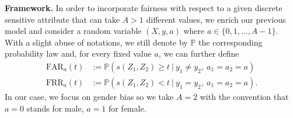 \documentclass[nohyperref]{article}
\theoremstyle{plain}
\theoremstyle{definition}
\theoremstyle{remark}
\begin{document}
{\bf Framework.} In order to incorporate fairness with respect to a given discrete sensitive attribute that can take $A > 1$ different values, we enrich our previous model and consider a random variable $(X,y,a)$ where $a \in \{0, 1, \ldots, A-1 \}$. With a slight abuse of notations, we still denote by $\mathbb{P}$ the corresponding probability law and, for every fixed value $a$, we can further define
\begin{equation*}
\begin{array}{cc}
 \mathrm{FAR}_a(t) \! \! \! \! &:= \mathbb{P}( s(Z_1,Z_2) \geq t \ | \ y_1 \neq y_2, \ a_1=a_2=a) \\
 \mathrm{FRR}_a(t) \! \! \! \! &:= \mathbb{P}( s(Z_1,Z_2) < t \ | \ y_1 = y_2, \ a_1=a_2=a).
\end{array}    
\end{equation*}
In our case, we focus on gender bias so we take $A=2$ with the convention that $a = 0$ stands for male, $a = 1$ for female. 
\end{document}

